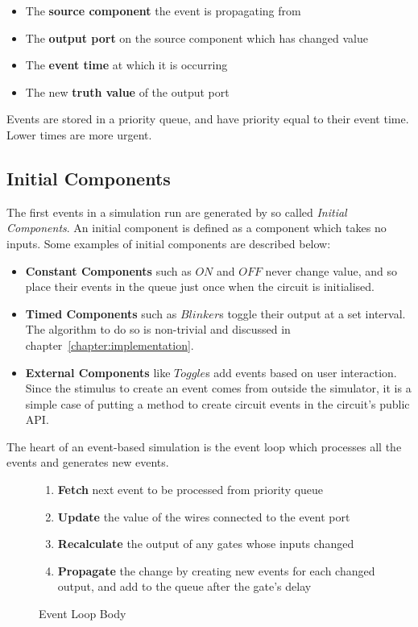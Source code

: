 \begin{itemize}
	\item The \textbf{source component} the event is propagating from
	\item The \textbf{output port} on the source component which has changed value
	\item The \textbf{event time} at which it is occurring
	\item The new \textbf{truth value} of the output port
\end{itemize}

Events are stored in a priority queue, and have priority equal to their event time. Lower times are more urgent. 

\subsection{Initial Components}
\label{subsec:initial}
The first events in a simulation run are generated by so called \textit{Initial Components}. An initial component is defined as a component which takes no inputs. Some examples of initial components are described below:

\begin{itemize}
	\item \textbf{Constant Components} such as $ON$ and $OFF$ never change value, and so place their events in the queue just once when the circuit is initialised.
	
	\item \textbf{Timed Components} such as $Blinker$s toggle their output at a set interval. The algorithm to do so is non-trivial and discussed in chapter~\ref{chapter:implementation}.
	
	\item \textbf{External Components} like $Toggle$s add events based on user interaction. Since the stimulus to create an event comes from outside the simulator, it is a simple case of putting a method to create circuit events in the circuit's public API.
\end{itemize}

The heart of an event-based simulation is the event loop which processes all the events and generates new events.

\begin{figure}[H]
\begin{enumerate}
	\item \textbf{Fetch} next event to be processed from priority queue
	\item \textbf{Update} the value of the wires connected to the event port
	\item \textbf{Recalculate} the output of any gates whose inputs changed
	\item \textbf{Propagate} the change by creating new events for each changed output, and add to the queue after the gate's delay
\end{enumerate}
\caption{Event Loop Body}
\end{figure}


